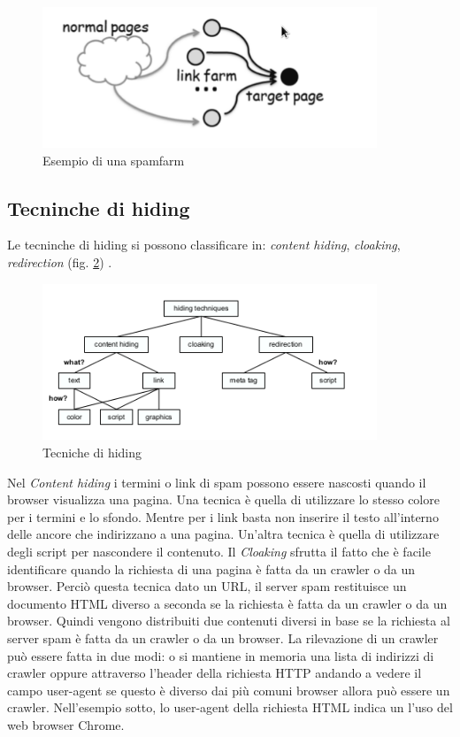 \begin{figure} 
 \centering
 \includegraphics[width=10cm]{immagini/spamfarm}
 \caption{Esempio di una spamfarm}
 \label{fig:spamfarm}
\end{figure}

\subsection{Tecninche di hiding}
Le tecninche di hiding si possono classificare in: \textit{content hiding}, \textit{cloaking}, \textit{redirection} (fig. \ref{fig:tecnicheHiding}) \cite{ilprints646}.
\begin{figure} 
 \centering
 \includegraphics[width=10cm]{immagini/tassonomiaHiding}
 \caption{Tecniche di hiding}
 \label{fig:tecnicheHiding}
\end{figure}
Nel \textit{Content hiding} i termini o link di spam possono essere nascosti quando il browser visualizza una pagina. Una tecnica è quella di utilizzare lo stesso colore per i termini e lo sfondo. Mentre per i link basta non inserire il testo all'interno delle ancore che indirizzano a una pagina. Un'altra tecnica è quella di utilizzare degli script per nascondere il contenuto. Il \textit{Cloaking} sfrutta il fatto che è facile identificare quando la richiesta di una pagina è fatta da un crawler o da un browser. Perciò questa tecnica dato un URL, il server spam restituisce un documento HTML diverso a seconda se la richiesta è fatta da un crawler o da un browser. Quindi vengono distribuiti due contenuti diversi in base se la richiesta al server spam è fatta da un crawler o da un browser. La rilevazione di un crawler può essere fatta in due modi: o si mantiene in memoria una lista di indirizzi di crawler oppure attraverso l'header della richiesta HTTP andando a vedere il campo user-agent se questo è diverso dai più comuni browser allora può essere un crawler. Nell'esempio sotto, lo user-agent della richiesta HTML indica un l'uso del web browser Chrome.
